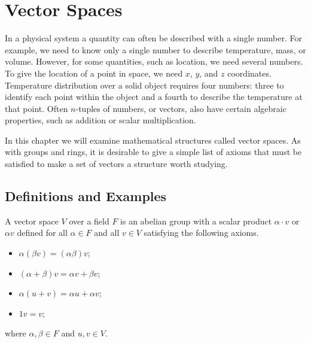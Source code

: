 \chapter{Vector Spaces}\label{vect}


 
In a physical system a quantity can often be described with a single
number. For example, we need to know only a single number to describe
temperature, mass, or volume.  However, for some quantities, such as
location, we need several numbers. To give the location of a point in
space, we need $x$, $y$, and $z$ coordinates. Temperature
distribution over a solid object requires four numbers: three to
identify each point within the object and a fourth to describe the
temperature at that point.  Often $n$-tuples of numbers, or vectors,
also have certain algebraic properties, such as addition or scalar 
multiplication.  


In this chapter we will examine mathematical structures called vector
spaces. As with groups and rings, it is desirable to give a simple
list of axioms that must be satisfied to make a set of vectors a
structure worth studying.  
 
 
 
\section{Definitions and Examples}
 

A {\bfi vector space\/} $V$ over a
field $F$ is an abelian group with a {\bfi scalar
product\/} $\alpha \cdot v$ or $\alpha v$ defined
for all $\alpha \in F$ and all $v \in V$ satisfying the following
axioms.  
\begin{itemize}

\item 
$\alpha(\beta v) =(\alpha \beta)v$;

\item 
$(\alpha + \beta)v =\alpha v + \beta v$;

\item 
$\alpha(u + v) = \alpha u + \alpha v$;

\item 
$1v=v$;

\end{itemize}
where $\alpha, \beta \in F$ and $u, v \in V$.
 

